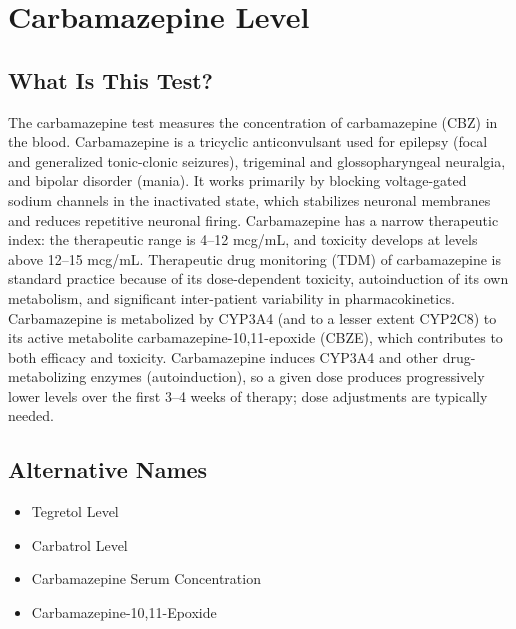 \chapter{Carbamazepine Level}

\section*{What Is This Test?}
The carbamazepine test measures the concentration of carbamazepine (CBZ) in the blood. Carbamazepine is a tricyclic anticonvulsant used for epilepsy (focal and generalized tonic-clonic seizures), trigeminal and glossopharyngeal neuralgia, and bipolar disorder (mania). It works primarily by blocking voltage-gated sodium channels in the inactivated state, which stabilizes neuronal membranes and reduces repetitive neuronal firing. Carbamazepine has a narrow therapeutic index: the therapeutic range is 4--12 mcg/mL, and toxicity develops at levels above 12--15 mcg/mL. Therapeutic drug monitoring (TDM) of carbamazepine is standard practice because of its dose-dependent toxicity, autoinduction of its own metabolism, and significant inter-patient variability in pharmacokinetics. Carbamazepine is metabolized by CYP3A4 (and to a lesser extent CYP2C8) to its active metabolite carbamazepine-10,11-epoxide (CBZE), which contributes to both efficacy and toxicity. Carbamazepine induces CYP3A4 and other drug-metabolizing enzymes (autoinduction), so a given dose produces progressively lower levels over the first 3--4 weeks of therapy; dose adjustments are typically needed.

\section*{Alternative Names}
\begin{itemize}
  \item Tegretol Level
  \item Carbatrol Level
  \item Carbamazepine Serum Concentration
  \item Carbamazepine-10,11-Epoxide
\end{itemize}
